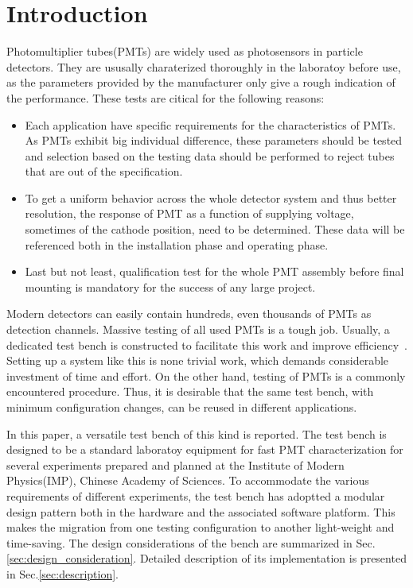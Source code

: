 \documentclass[5p, times]{elsarticle}
\begin{document}
\section{Introduction}
\label{sec:introduction}

Photomultiplier tubes(PMTs) are widely used as photosensors in particle detectors.
They are ususally charaterized thoroughly in the laboratoy before use, as the parameters provided by the manufacturer only give a rough indication of the performance.
These tests are citical for the following reasons:
\begin{itemize}
 \item Each application have specific requirements for the characteristics of PMTs.
 As PMTs exhibit big individual difference, these parameters should be tested and selection based on the testing data should be performed to reject tubes that are out of the specification.
 \item To get a uniform behavior across the whole detector system and thus better resolution, the response of PMT as a function of supplying voltage, sometimes of the cathode position, need to be determined.
  These data will be referenced both in the installation phase and operating phase. 
 \item Last but not least, qualification test for the whole PMT assembly before final mounting is mandatory for the success of any large project. 
\end{itemize}

Modern detectors can easily contain hundreds, even thousands of PMTs as detection channels.
Massive testing of all used PMTs is a tough job.
Usually, a dedicated test bench is constructed to facilitate this work and improve efficiency~\cite{barnhill_testing_2008,akgun_complete_2005,adragna_pmt-block_2006}.
Setting up a system like this is none trivial work, which demands considerable investment of time and effort.
On the other hand, testing of PMTs is a commonly encountered procedure.
Thus, it is desirable that the same test bench, with minimum configuration changes, can be reused in different applications. 

In this paper, a versatile test bench of this kind is reported.
The test bench is designed to be a standard laboratoy equipment for fast PMT characterization for several experiments prepared and planned at the Institute of Modern Physics(IMP), Chinese Academy of Sciences.
To accommodate the various requirements of different experiments, the test bench has adoptted a modular design pattern both in the hardware and the associated software platform.
This makes the migration from one testing configuration to another light-weight and time-saving.
The design considerations of the bench are summarized in Sec.\ref{sec:design_consideration}.
Detailed description of its implementation is presented in Sec.\ref{sec:description}.
\end{document}
